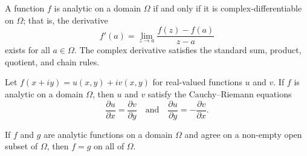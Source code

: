 \begin{proposition}
    A function \(f\) is analytic on a domain \(\Omega\) if and only if it is complex-differentiable on \(\Omega\); that is, the derivative
    \[
        f'(a) = \lim_{z \to a} \frac{f(z) - f(a)}{z - a}
    \]
    exists for all \(a \in \Omega\).
    The complex derivative satisfies the standard sum, product, quotient, and chain rules.
\end{proposition}

\begin{proposition}
    Let \(f(x + iy) = u(x, y) + i v(x, y)\) for real-valued functions \(u\) and \(v\). If \(f\) is analytic on a domain \(\Omega\), then \(u\) and \(v\) satisfy the Cauchy--Riemann equations
    \[
        \frac{\partial u}{\partial x} = \frac{\partial v}{\partial y} \quad \text{and} \quad \frac{\partial u}{\partial y} = -\frac{\partial v}{\partial x}.
    \]
\end{proposition}

\begin{proposition}
    If \(f\) and \(g\) are analytic functions on a domain \(\Omega\) and agree on a non-empty open subset of \(\Omega\), then \(f = g\) on all of \(\Omega\).
\end{proposition}